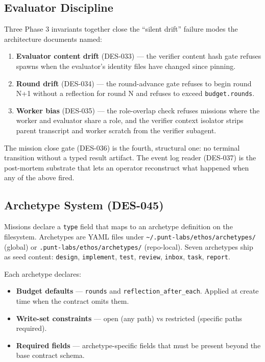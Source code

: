 \documentclass[a4paper,10pt]{article}
\newcommand{\field}[1]{\texttt{#1}}
\newcommand{\fpath}[1]{\texttt{#1}}
\begin{document}
\subsection{Evaluator Discipline}

Three Phase 3 invariants together close the ``silent drift'' failure
modes the architecture documents named:

\begin{enumerate}
  \item \textbf{Evaluator content drift} (DES-033) --- the verifier
    content hash gate refuses spawns when the evaluator's identity
    files have changed since pinning.
  \item \textbf{Round drift} (DES-034) --- the round-advance gate
    refuses to begin round N+1 without a reflection for round N
    and refuses to exceed \field{budget.rounds}.
  \item \textbf{Worker bias} (DES-035) --- the role-overlap check
    refuses missions where the worker and evaluator share a role,
    and the verifier context isolator strips parent transcript and
    worker scratch from the verifier subagent.
\end{enumerate}

The mission close gate (DES-036) is the fourth, structural one:
no terminal transition without a typed result artifact.  The
event log reader (DES-037) is the post-mortem substrate that lets
an operator reconstruct what happened when any of the above fired.

\subsection{Archetype System (DES-045)}

Missions declare a \field{type} field that maps to an archetype
definition on the filesystem.  Archetypes are YAML files under
\fpath{\~{}/.punt-labs/ethos/archetypes/} (global) or
\fpath{.punt-labs/ethos/archetypes/} (repo-local).  Seven
archetypes ship as seed content: \texttt{design},
\texttt{implement}, \texttt{test}, \texttt{review},
\texttt{inbox}, \texttt{task}, \texttt{report}.

Each archetype declares:

\begin{itemize}
  \item \textbf{Budget defaults} --- \field{rounds} and
    \field{reflection\_after\_each}.  Applied at create time when
    the contract omits them.
  \item \textbf{Write-set constraints} --- open (any path) vs
    restricted (specific paths required).
  \item \textbf{Required fields} --- archetype-specific fields that
    must be present beyond the base contract schema.
\end{itemize}
\end{document}
